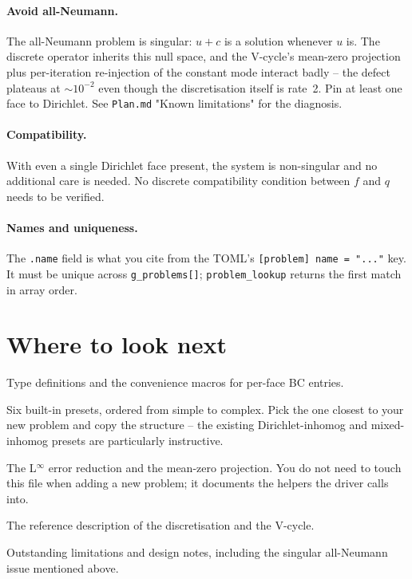 \documentclass[11pt]{article}
\begin{document}
\paragraph{Avoid all-Neumann.}
The all-Neumann problem is singular: $u + c$ is a solution whenever
$u$ is.  The discrete operator inherits this null space, and the
V-cycle's mean-zero projection plus per-iteration re-injection of
the constant mode interact badly -- the defect plateaus at
$\sim 10^{-2}$ even though the discretisation itself is rate~2.
Pin at least one face to Dirichlet.  See \texttt{Plan.md} "Known
limitations" for the diagnosis.

\paragraph{Compatibility.}
With even a single Dirichlet face present, the system is
non-singular and no additional care is needed.  No discrete
compatibility condition between $f$ and $q$ needs to be verified.

\paragraph{Names and uniqueness.}
The \texttt{.name} field is what you cite from the TOML's
\texttt{[problem] name = "..."} key.  It must be unique across
\texttt{g\_problems[]}; \texttt{problem\_lookup} returns the first
match in array order.

\section{Where to look next}

\begin{description}[leftmargin=2em,style=nextline]
\item[\texttt{src/problem.h}, \texttt{src/bc.h}]
  Type definitions and the convenience macros for per-face BC entries.
\item[\texttt{src/problem\_registry.c}]
  Six built-in presets, ordered from simple to complex.  Pick the one
  closest to your new problem and copy the structure -- the existing
  Dirichlet-inhomog and mixed-inhomog presets are particularly
  instructive.
\item[\texttt{src/problem\_helpers.c}]
  The L${}^\infty$ error reduction and the mean-zero projection.  You
  do not need to touch this file when adding a new problem; it
  documents the helpers the driver calls into.
\item[\texttt{doc/documentation.tex}]
  The reference description of the discretisation and the V-cycle.
\item[\texttt{Plan.md}]
  Outstanding limitations and design notes, including the singular
  all-Neumann issue mentioned above.
\end{description}
\end{document}
